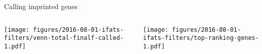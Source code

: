 \documentclass{beamer}
\begin{document}
\begin{frame}[label=filtering-calling]{Calling imprinted genes}
\begin{columns}[t]
\begin{column}{0.5\textwidth}

\texttt{[image: figures/2016-08-01-ifats-filters/venn-total-finalf-called-1.pdf]}
\end{column}

\begin{column}{0.5\textwidth}

\texttt{[image: figures/2016-08-01-ifats-filters/top-ranking-genes-1.pdf]}
\end{column}
\end{columns}
\end{frame}
\end{document}

